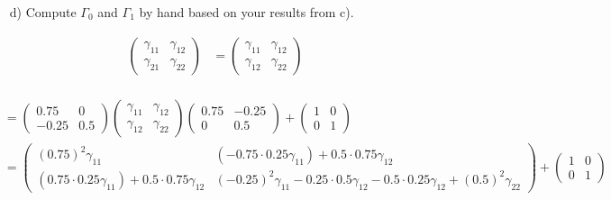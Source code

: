 \documentclass[12pt,a4paper]{article}
\begin{document}
\begin{itemize}
    \item[d)] Compute $\Gamma_0$ and $\Gamma_1$ by hand based on your results from c).
\end{itemize}

\begin{align*}
  \begin{pmatrix} 
  \gamma_{11} & \gamma_{12}\\
  \gamma_{21} & \gamma_{22}
  \end{pmatrix} & =
  \begin{pmatrix} 
  \gamma_{11} & \gamma_{12}\\
  \gamma_{12} & \gamma_{22}
  \end{pmatrix}\\ 
\end{align*}

\begin{align*}
  & =
  \begin{pmatrix} 
  0.75 & 0\\
  -0.25 & 0.5
  \end{pmatrix} 
  \begin{pmatrix} 
  \gamma_{11} & \gamma_{12}\\
  \gamma_{12} & \gamma_{22}
  \end{pmatrix}
  \begin{pmatrix} 
  0.75 & -0.25\\
  0 & 0.5
  \end{pmatrix} +
  \begin{pmatrix} 
  1 & 0\\
  0 & 1
  \end{pmatrix}\\
  & = 
  \begin{pmatrix}
  (0.75)^2 \gamma_{11} & (-0.75 \cdot 0.25 \gamma_{11}) + 0.5 \cdot 0.75 \gamma_{12} \\
  (0.75 \cdot 0.25 \gamma_{11}) + 0.5 \cdot 0.75 \gamma_{12} & (-0.25)^2 \gamma_{11} - 0.25 \cdot 0.5 \gamma_{12} - 0.5 \cdot 0.25 \gamma_{12} + (0.5)^2 \gamma_{22}
  \end{pmatrix} +
  \begin{pmatrix}
  1 & 0\\
  0 & 1
  \end{pmatrix}
  \end{align*}
\end{document}
